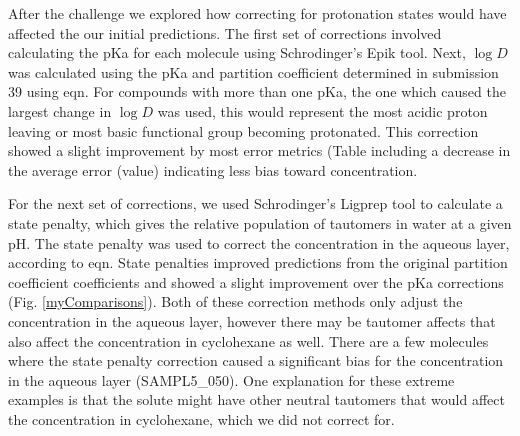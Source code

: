 After the challenge we explored how correcting for protonation states would have affected the our initial predictions. 
The first set of corrections involved calculating the pKa for each molecule using Schrodinger's Epik tool. 
Next, $\log D$ was calculated using the pKa and partition coefficient determined in submission 39 using eqn. %
For compounds with more than one pKa, the one which caused the largest change in $\log D$ was used, this would represent the most acidic proton leaving or most basic functional group becoming protonated. %
This correction showed a slight improvement by most error metrics (Table %
including a decrease in the average error (value) indicating less bias toward concentration. 

For the next set of corrections, we used Schrodinger's Ligprep tool to calculate a state penalty, which gives the relative population of tautomers in water at a given pH. %
The state penalty was used to correct the concentration in the aqueous layer, according to eqn. %
State penalties improved predictions from the original partition coefficient coefficients and showed a slight improvement over the pKa corrections (Fig. \ref{myComparisons}). 
Both of these correction methods only adjust the concentration in the aqueous layer, however there may be tautomer affects that also affect the concentration in cyclohexane as well. 
There are a few molecules where the state penalty correction caused a significant bias for the concentration in the aqueous layer (SAMPL5\_050). %
One explanation for these extreme examples is that the solute might have other neutral tautomers that would affect the concentration in cyclohexane, which we did not correct for. 


